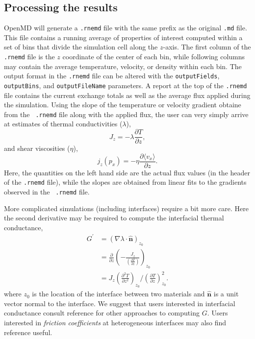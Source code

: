 \documentclass[]{book}
\begin{document}
\subsection{\label{section:rnemdResults} Processing the results} 
OpenMD will generate a {\tt .rnemd}
file with the same prefix as the original {\tt .md} file.  This file
contains a running average of properties of interest computed within a
set of bins that divide the simulation cell along the $z$-axis.  The
first column of the {\tt .rnemd} file is the $z$ coordinate of the
center of each bin, while following columns may contain the average
temperature, velocity, or density within each bin.  The output format
in the {\tt .rnemd} file can be altered with the {\tt outputFields},
{\tt outputBins}, and {\tt outputFileName} parameters.  A report at
the top of the {\tt .rnemd} file contains the current exchange totals
as well as the average flux applied during the simulation.  Using the
slope of the temperature or velocity gradient obtaine from the {\tt
  .rnemd} file along with the applied flux, the user can very simply
arrive at estimates of thermal conductivities ($\lambda$),
\begin{equation}
J_z = -\lambda \frac{\partial T}{\partial z},
\end{equation}
and shear viscosities ($\eta$),
\begin{equation}
j_z(p_x) = -\eta \frac{\partial \langle v_x \rangle}{\partial z}.
\end{equation}
Here, the quantities on the left hand side are the actual flux values
(in the header of the {\tt .rnemd} file), while the slopes are
obtained from linear fits to the gradients observed in the {\tt
  .rnemd} file.

More complicated simulations (including interfaces) require a bit more
care.  Here the second derivative may be required to compute the
interfacial thermal conductance,
\begin{align}
  G^\prime &= \left(\nabla\lambda \cdot \mathbf{\hat{n}}\right)_{z_0} \\
  &= \frac{\partial}{\partial z}\left(-\frac{J_z}{
      \left(\frac{\partial T}{\partial z}\right)}\right)_{z_0} \\
  &= J_z\left(\frac{\partial^2 T}{\partial z^2}\right)_{z_0} \Big/
  \left(\frac{\partial T}{\partial z}\right)_{z_0}^2.
  \label{derivativeG}
\end{align}
where $z_0$ is the location of the interface between two materials and
$\mathbf{\hat{n}}$ is a unit vector normal to the interface.  We
suggest that users interested in interfacial conductance consult
reference \citealp{kuang:AuThl} for other approaches to computing $G$.
Users interested in {\it friction coefficients} at heterogeneous
interfaces may also find reference \citealp{2012MolPh.110..691K}
useful.
\end{document}
